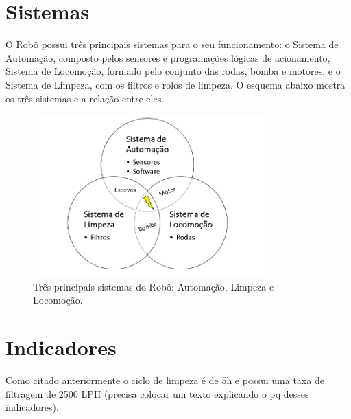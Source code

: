 \section{Sistemas}
O Robô possui três principais sistemas para o seu funcionamento: o Sistema de Automação, composto pelos sensores e programações lógicas de acionamento, Sistema de Locomoção, formado pelo conjunto das rodas, bomba e motores, e o Sistema de Limpeza, com os filtros e rolos de limpeza. O esquema abaixo mostra os três sistemas e a relação entre eles.
\par
  \begin{figure}[h]
    \centering
    \includegraphics[width=0.8\textwidth]{figures/main-system-project.png}
    \caption{Três principais sistemas do Robô: Automação, Limpeza e Locomoção.}
    \label{fig:main-system-project}
  \end{figure}
  \FloatBarrier
\par

\section{Indicadores}
Como citado anteriormente o ciclo de limpeza é de 5h e possui uma taxa de filtragem de 2500 LPH (precisa colocar um texto explicando o pq desses indicadores).

